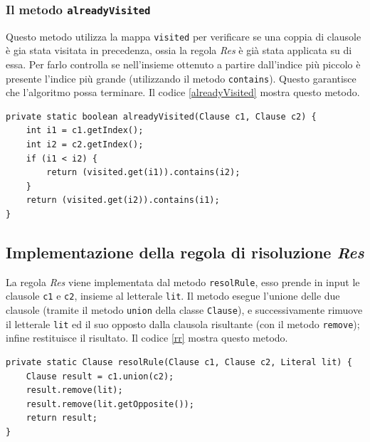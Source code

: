 \documentclass[a4paper,12pt]{report}
\begin{document}
\subsubsection{Il metodo \texttt{alreadyVisited}}
Questo metodo utilizza la mappa \texttt{visited} per verificare se una coppia di clausole è gia stata visitata in precedenza, ossia la regola \emph{Res} è già stata applicata su di essa. Per farlo controlla se nell'insieme ottenuto a partire dall'indice più piccolo è presente l'indice più grande (utilizzando il metodo \texttt{contains}). Questo garantisce che l'algoritmo possa terminare. Il codice \ref{alreadyVisited} mostra questo metodo.

\begin{minipage}{\linewidth}
    \small
    \begin{lstlisting}[caption={Metodo \texttt{alreadyVisited} della classe \texttt{Resolution}}, label={alreadyVisited}]
private static boolean alreadyVisited(Clause c1, Clause c2) {
    int i1 = c1.getIndex();
    int i2 = c2.getIndex();
    if (i1 < i2) {
        return (visited.get(i1)).contains(i2);
    }
    return (visited.get(i2)).contains(i1);
}
    \end{lstlisting}
\end{minipage}

\subsection{Implementazione della regola di risoluzione \emph{Res}}
\label{resolRule}
La regola \emph{Res} viene implementata dal metodo \texttt{resolRule}, esso prende in input le clausole \texttt{c1} e \texttt{c2}, insieme al letterale \texttt{lit}. Il metodo esegue l'unione delle due clausole (tramite il metodo \texttt{union} della classe \texttt{Clause}), e successivamente rimuove il letterale \texttt{lit} ed il suo opposto dalla clausola risultante (con il metodo \texttt{remove}); infine restituisce il risultato. Il codice \ref{rr} mostra questo metodo.

\begin{minipage}{\linewidth}
    \begin{lstlisting}[caption={Metodo \texttt{resolRule} della classe Resolution}, label={rr}]
private static Clause resolRule(Clause c1, Clause c2, Literal lit) {
    Clause result = c1.union(c2);
    result.remove(lit);
    result.remove(lit.getOpposite());
    return result;
}
    \end{lstlisting}
\end{minipage}
\end{document}
